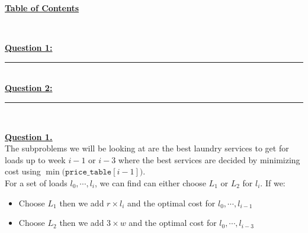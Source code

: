 \documentclass[12pt]{article}
\begin{document}
\begin{center}
	\hypertarget{toc}{\LARGE \underline{\textbf{Table of Contents}}}\\
\end{center}

\hyperlink{1}{\textbf{Question 1:}}
\vspace{1mm}
\hrule
\vspace{1mm} \leavevmode \\

\hyperlink{2}{\textbf{Question 2:}}
\vspace{1mm}
\hrule
\vspace{1mm} \leavevmode \\

\newpage

\hyperlink{toc}{\hypertarget{1}{\LARGE \underline{\textbf{Question 1.}}}}\\

The subproblems we will be looking at are the best laundry services to get for loads up to week $i-1$ or $i-3$
where the best services are decided by minimizing cost using $\min\big(\texttt{price\_table}[i-1]\big)$.\\
For a set of loads $l_0, \cdots , l_i$, we can find can either choose $L_1$ or $L_2$ for $l_i$. If we:
\begin{itemize}
	\itemsep0em
	\item Choose $L_1$ then we add $r\times l_i$ and the optimal cost for $l_0, \cdots , l_{i-1}$
	\item Choose $L_2$ then we add $3\times w$ and the optimal cost for $l_0, \cdots , l_{i-3}$
\end{itemize}
\end{document}

